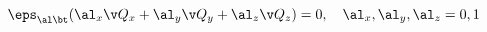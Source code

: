 \begin{equation}
 \eps_{\al\bt}( \al_x\v Q_x+ \al_y\v Q_y+ \al_z\v Q_z)=0,\ \ \ 
 \al_x,\al_y,\al_z=0,1
\end{equation}

